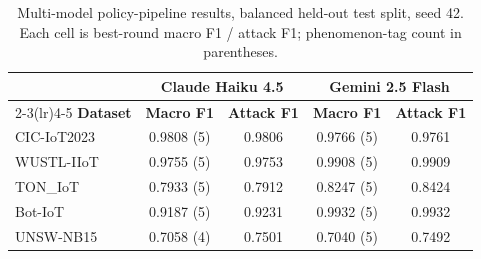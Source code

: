 \begin{table}[htbp]
\centering
\caption{Multi-model policy-pipeline results, balanced held-out test split, seed 42.
  Each cell is best-round macro F1 / attack F1; phenomenon-tag count in parentheses.}
\label{tab:new_pipeline}
\begin{tabular}{lcccc}
\toprule
 & \multicolumn{2}{c}{Claude Haiku 4.5} & \multicolumn{2}{c}{Gemini 2.5 Flash} \\
\cmidrule(lr){2-3}\cmidrule(lr){4-5}
\textbf{Dataset} & \textbf{Macro F1} & \textbf{Attack F1} & \textbf{Macro F1} & \textbf{Attack F1} \\
\midrule
CIC-IoT2023 & 0.9808 (5) & 0.9806 & 0.9766 (5) & 0.9761 \\
WUSTL-IIoT & 0.9755 (5) & 0.9753 & 0.9908 (5) & 0.9909 \\
TON_IoT & 0.7933 (5) & 0.7912 & 0.8247 (5) & 0.8424 \\
Bot-IoT & 0.9187 (5) & 0.9231 & 0.9932 (5) & 0.9932 \\
UNSW-NB15 & 0.7058 (4) & 0.7501 & 0.7040 (5) & 0.7492 \\
\bottomrule
\end{tabular}
\end{table}
